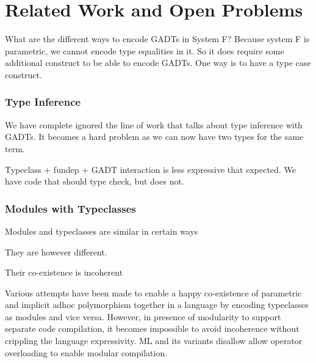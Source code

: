\documentclass[manuscript,screen,nonacm]{acmart}
\begin{document}
\section{Related Work and Open Problems}
What are the different ways to encode GADTs in System F?
Because system F is parametric, we cannot encode type equalities in it. So it does require some additional construct to be able to encode GADTs. One way is to have a type case construct.
\label{sec:related-work}
\subsubsection{Type Inference}
We have complete ignored the line of work that talks about type inference with GADTs. It becomes a hard problem as we can now have two types for the same term.

Typeclass + fundep + GADT interaction is less expressive that expected. We have code that should type check, but does not.


\subsubsection{Modules with Typeclasses}
Modules and typeclasses are similar in certain ways

They are however different.

Their co-existence is incoherent

Various attempts\cite{dreyer_modular_2007, wehr_ml_2008, white_modular_2014} have been made to enable a happy co-existence of parametric and implicit adhoc polymorphism together in a language by encoding typeclasses as modules and vice versa. However, in presence of modularity to support separate code compilation, it becomes impossible to avoid incoherence without crippling the language expressivity.
ML and its variants\cite{milner_definition_1997,leroy_ocaml_2023} disallow allow operator overloading to enable modular compilation.
\end{document}
